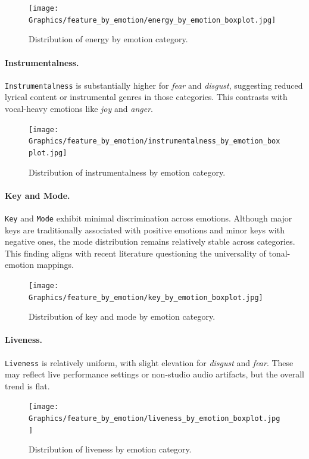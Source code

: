 \documentclass{article}
\begin{document}
\begin{figure}[H]
\centering
\texttt{[image: Graphics/feature\_by\_emotion/energy\_by\_emotion\_boxplot.jpg]}
\caption{Distribution of energy by emotion category.}
\label{fig:energy}
\end{figure}

\paragraph{Instrumentalness.}
\texttt{Instrumentalness} is substantially higher for \textit{fear} and \textit{disgust}, suggesting reduced lyrical content or instrumental genres in those categories. This contrasts with vocal-heavy emotions like \textit{joy} and \textit{anger}.

\begin{figure}[H]
\centering
\texttt{[image: Graphics/feature\_by\_emotion/instrumentalness\_by\_emotion\_boxplot.jpg]}
\caption{Distribution of instrumentalness by emotion category.}
\label{fig:instrumentalness}
\end{figure}

\paragraph{Key and Mode.}
\texttt{Key} and \texttt{Mode} exhibit minimal discrimination across emotions. Although major keys are traditionally associated with positive emotions and minor keys with negative ones, the mode distribution remains relatively stable across categories. This finding aligns with recent literature questioning the universality of tonal-emotion mappings.

\begin{figure}[H]
\centering
\texttt{[image: Graphics/feature\_by\_emotion/key\_by\_emotion\_boxplot.jpg]}
\caption{Distribution of key and mode by emotion category.}
\label{fig:key_mode}
\end{figure}

\paragraph{Liveness.}
\texttt{Liveness} is relatively uniform, with slight elevation for \textit{disgust} and \textit{fear}. These may reflect live performance settings or non-studio audio artifacts, but the overall trend is flat.

\begin{figure}[H]
\centering
\texttt{[image: Graphics/feature\_by\_emotion/liveness\_by\_emotion\_boxplot.jpg]}
\caption{Distribution of liveness by emotion category.}
\label{fig:liveness}
\end{figure}
\end{document}

